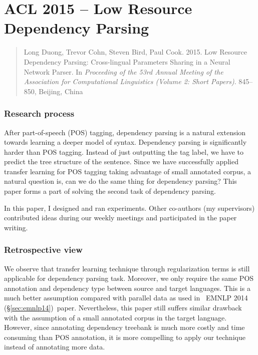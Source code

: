\documentclass[12pt,twoside,final,hidelinks]{ltthesis}
\theoremstyle{definition}
\newcommand\emnlpiv{EMNLP 2014 (\S\ref{sec:emnlp14})}
\begin{document}
%



\section{ACL 2015 -- Low Resource Dependency Parsing}
\label{sec:acl15}

\begin{quote}
Long Duong, Trevor Cohn, Steven Bird, Paul Cook. 2015. Low Resource Dependency Parsing: Cross-lingual Parameters Sharing in a Neural Network Parser. In\textit{ Proceeding of the 53rd Annual Meeting of the Association for Computational Linguistics (Volume 2: Short Papers)}.  845--850, Beijing, China
\end{quote}
\subsubsection{Research process}
After part-of-speech (POS) tagging, dependency parsing is a natural extension towards learning a deeper model of syntax. Dependency parsing is significantly 
harder than POS tagging. Instead of just outputting the tag label, we have to predict the tree structure of the sentence. Since we have successfully 
applied transfer learning for POS tagging taking advantage of small annotated corpus, a natural question is, can we do the same thing for dependency 
parsing? This paper forms a part of solving the second task of dependency parsing. 

In this paper, I designed and ran experiments. Other co-authors (my supervisors) contributed ideas during our weekly 
meetings and participated in the paper writing. 

\subsubsection{Retrospective view}
We observe that transfer learning technique through regularization terms is still applicable for dependency parsing task. Moreover, we only 
require the same POS annotation and dependency type between source and target languages. This is a much better 
assumption compared with parallel data as used in ~\emnlpiv\ paper. Nevertheless, this paper still suffers similar drawback with the assumption of 
a small annotated corpus in the target language. However, since annotating dependency treebank is much more costly and time consuming than POS annotation, it is more compelling to apply our technique instead of annotating more data.  
\end{document}
